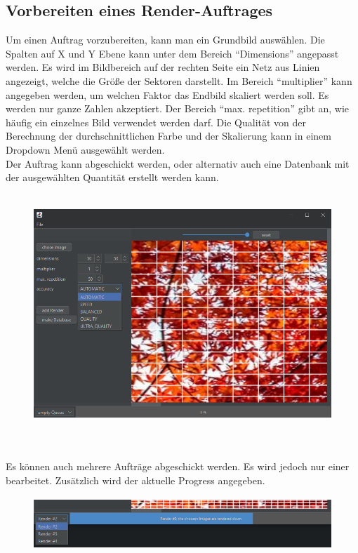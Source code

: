 \newpage
\subsection*{Vorbereiten eines Render-Auftrages}
Um einen Auftrag vorzubereiten, kann man ein Grundbild auswählen. Die Spalten auf X und Y Ebene kann unter dem Bereich ``Dimensions'' angepasst werden. Es wird im Bildbereich auf der rechten Seite ein Netz aus Linien angezeigt, welche die Größe der Sektoren darstellt. Im Bereich ``multiplier'' kann angegeben werden, um welchen Faktor das Endbild skaliert werden soll. Es werden nur ganze Zahlen akzeptiert. Der Bereich ``max. repetition'' gibt an, wie häufig ein einzelnes Bild verwendet werden darf. Die Qualität von der Berechnung der durchschnittlichen Farbe und der Skalierung kann in einem Dropdown Menü ausgewählt werden.\\ Der Auftrag kann abgeschickt werden, oder alternativ auch eine Datenbank mit der ausgewählten Quantität erstellt werden kann.
\begin{figure}[h]
    \centering
    \includegraphics[height=9cm]{images/Bedienungsanleitung/normal UI.png}
    \label{Hauptbereich}
\end{figure}
\\Es können auch mehrere Aufträge abgeschickt werden. Es wird jedoch nur einer bearbeitet. Zusätzlich wird der aktuelle Progress angegeben.
\begin{figure}[h]
    \centering
    \includegraphics[height=2cm]{images/Bedienungsanleitung/render queue.png}
\end{figure}

